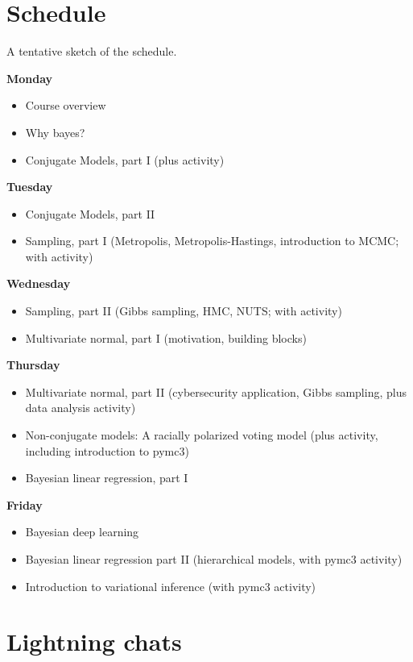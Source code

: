 \documentclass{article} %
\begin{document}
\section{Schedule}

A tentative sketch of the schedule. 


\textbf{Monday}
\begin{itemize}
\item Course overview 
\item Why bayes?
\item Conjugate Models, part I (plus activity)
\end{itemize}

\textbf{Tuesday}

\begin{itemize}
\item Conjugate Models, part II
\item Sampling, part I (Metropolis, Metropolis-Hastings, introduction to MCMC; with activity) 
\end{itemize}

\textbf{Wednesday}
\begin{itemize}
\item Sampling, part II (Gibbs sampling, HMC, NUTS; with activity) 
\item Multivariate normal, part I (motivation, building blocks)
\end{itemize}

\textbf{Thursday}
\begin{itemize}
\item Multivariate normal, part II (cybersecurity application, Gibbs sampling, plus data analysis activity) 
\item Non-conjugate models:  A racially polarized voting model (plus activity, including introduction to pymc3)
\item Bayesian linear regression, part I 
\end{itemize}

\textbf{Friday}
\begin{itemize}
\item Bayesian deep learning 
\item Bayesian linear regression part II (hierarchical models, with pymc3 activity)
\item Introduction to variational inference (with pymc3 activity)
\end{itemize}


\section{Lightning chats}
\end{document}
